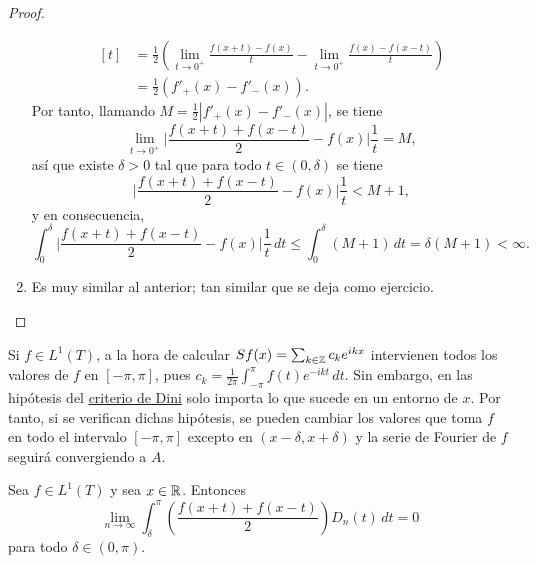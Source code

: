 \documentclass[a4paper, 11pt, oneside]{report}
\begin{document}
\begin{proof}
\begin{enumerate}
\[\begin{aligned}[t]
      &= \frac{1}{2}\left(\lim_{t \to 0^+} \frac{f(x+t)-f(x)}{t} - \lim_{t \to 0^+} \frac{f(x)-f(x-t)}{t}\right) \\
      &= \frac{1}{2}(f'_+(x)-f'_-(x)).
    \end{aligned}\]
    Por tanto, llamando $M = \frac{1}{2}|f'_+(x)-f'_-(x)|$, se tiene
    \[\lim_{t \to 0^+} \biggl|\frac{f(x+t)+f(x-t)}{2}-f(x)\biggr|\frac{1}{t} = M,\]
    así que existe $\delta > 0$ tal que para todo $t \in (0,\delta)$ se tiene
    \[\biggl|\frac{f(x+t)+f(x-t)}{2}-f(x)\biggr|\frac{1}{t} < M+1,\]
    y en consecuencia,
    \[\int_0^\delta \biggl|\frac{f(x+t)+f(x-t)}{2}-f(x)\biggr| \frac{1}{t} \, dt \leq \int_0^\delta (M+1) \, dt = \delta(M+1) < \infty.\]
    \item Es muy similar al anterior; tan similar que se deja como ejercicio. \qedhere
  \end{enumerate}
\end{proof}

Si $f \in L^1(T)$, a la hora de calcular $Sf(x) = \sum_{k \in \mathbb Z} c_ke^{ikx}$ intervienen todos los valores de $f$ en $[-\pi,\pi]$, pues $c_k = \frac{1}{2\pi}\int_{-\pi}^\pi f(t)e^{-ikt} \, dt$. Sin embargo, en las hipótesis del \hyperref[teo:4.2.3]{\color{c1}criterio de Dini} solo importa lo que sucede en un entorno de $x$. Por tanto, si se verifican dichas hipótesis, se pueden cambiar los valores que toma $f$ en todo el intervalo $[-\pi,\pi]$ excepto en $(x-\delta,x+\delta)$ y la serie de Fourier de $f$ seguirá convergiendo a $A$.

\begin{theorem}\label{teo:4.2.5}
  Sea $f \in L^1(T)$ y sea $x \in \mathbb R$. Entonces
  \[\lim_{n \to \infty} \int_\delta^\pi \left(\frac{f(x+t)+f(x-t)}{2}\right)D_n(t) \, dt = 0\]
  para todo $\delta \in (0,\pi)$.
\end{theorem}
\end{document}
